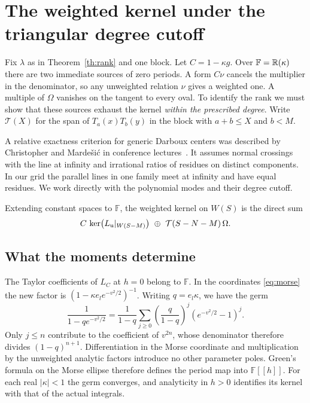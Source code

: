 \section{The weighted kernel under the triangular degree cutoff}\label{sec:carrier}

Fix $\lambda$ as in Theorem~\ref{th:rank} and one block. Let $C=1-\kappa g$. Over $\mathbb F=\mathbb R(\kappa)$ there are two immediate sources of zero periods. A form $C\nu$ cancels the multiplier in the denominator, so any unweighted relation $\nu$ gives a weighted one. A multiple of $\Omega$ vanishes on the tangent to every oval. To identify the rank we must show that these sources exhaust the kernel \emph{within the prescribed degree}. Write $\mathcal T(X)$ for the span of $T_a(x)T_b(y)$ in the block with $a+b\le X$ and $b<M$.

A relative exactness criterion for generic Darboux centers was described by Christopher and Marde\v{s}i\'c in conference lectures~\cite{relative}. It assumes normal crossings with the line at infinity and irrational ratios of residues on distinct components. In our grid the parallel lines in one family meet at infinity and have equal residues. We work directly with the polynomial modes and their degree cutoff.

\begin{proposition}\label{prop:kernel}
Extending constant spaces to $\mathbb F$, the weighted kernel on $W(S)$ is the direct sum
\begin{equation}\label{eq:kernel}
 C\,\ker\bigl(L_{\mathrm u}|_{W(S-M)}\bigr)\ \oplus\ \mathcal T(S-N-M)\,\Omega .
\end{equation}
\end{proposition}

\subsection{What the moments determine}
The Taylor coefficients of $L_C$ at $h=0$ belong to $\mathbb F$. In the coordinates \eqref{eq:morse} the new factor is $(1-\kappa e_l e^{-v^2/2})^{-1}$. Writing \(q=e_l\kappa\), we have the germ
\[
 \frac{1}{1-qe^{-v^2/2}}=\frac{1}{1-q}
   \sum_{j\ge0}\left(\frac{q}{1-q}\right)^j (e^{-v^2/2}-1)^j .
\]
Only \(j\le n\) contribute to the coefficient of \(v^{2n}\), whose denominator therefore divides \((1-q)^{n+1}\). Differentiation in the Morse coordinate and multiplication by the unweighted analytic factors introduce no other parameter poles. Green's formula on the Morse ellipse therefore defines the period map into $\mathbb F[[h]]$. For each real $|\kappa|<1$ the germ converges, and analyticity in $h>0$ identifies its kernel with that of the actual integrals.

